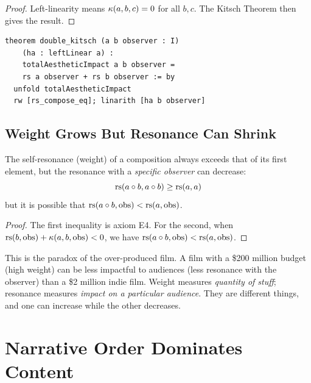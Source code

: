 \begin{proof}
Left-linearity means $\kappa(a, b, c) = 0$ for all $b, c$.
The Kitsch Theorem then gives the result.
\end{proof}

\begin{lstlisting}
theorem double_kitsch (a b observer : I)
    (ha : leftLinear a) :
    totalAestheticImpact a b observer =
    rs a observer + rs b observer := by
  unfold totalAestheticImpact
  rw [rs_compose_eq]; linarith [ha b observer]
\end{lstlisting}

\section{Weight Grows But Resonance Can Shrink}

\begin{theorem}
\label{thm:over-production}
The self-resonance (weight) of a composition always exceeds that of its
first element, but the resonance with a \emph{specific observer} can
decrease:
\[
  \mathrm{rs}(a \circ b, a \circ b) \geq \mathrm{rs}(a, a)
\]
but it is possible that $\mathrm{rs}(a \circ b, \mathrm{obs}) < \mathrm{rs}(a, \mathrm{obs})$.
\end{theorem}

\begin{proof}
The first inequality is axiom E4.  For the second, when
$\mathrm{rs}(b, \mathrm{obs}) + \kappa(a, b, \mathrm{obs}) < 0$,
we have $\mathrm{rs}(a \circ b, \mathrm{obs}) < \mathrm{rs}(a, \mathrm{obs})$.
\end{proof}

\begin{remark}
This is the paradox of the over-produced film.  A film with a
\$200 million budget (high weight) can be less impactful to audiences
(less resonance with the observer) than a \$2 million indie film.
Weight measures \emph{quantity of stuff}; resonance measures
\emph{impact on a particular audience}.  They are different things,
and one can increase while the other decreases.
\end{remark}



\chapter{Narrative Order Dominates Content}
\label{ch:order}

